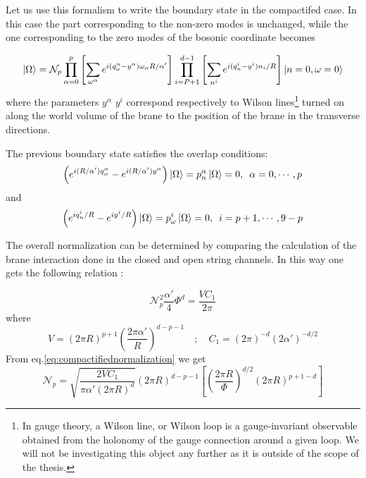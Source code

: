 Let us use this formalism to write the boundary state in the compactifed case. In this case the part corresponding to the non-zero modes is unchanged, while the one corresponding to the zero modes of the bosonic coordinate becomes \cite{Frau97}

\begin{equation}
\ket{\Omega} = \mathcal{N}_p\prod_{\alpha=0}^p{\left[\sum_{\omega^\alpha}e^{i(q_\omega^\alpha - y^\alpha)\omega_\alpha R/\alpha'}\right]}\prod_{i=P+1}^{d-1}{\left[\sum_{n^i}e^{i(q_n^i - y^i)n_i/R}\right]}\ket{n=0,\omega=0}
\end{equation}
where the parameters $y^\alpha$ $y^i$ correspond respectively to Wilson lines\footnote{In gauge theory, a Wilson line, or Wilson loop is a gauge-invariant observable obtained from the holonomy of the gauge connection around a given loop. We will not be investigating this object any further as it is outside of the scope of the thesis. } turned on along the world volume of the brane to the position of the brane in the transverse directions.
\par
The previous boundary state satisfies the overlap conditions:
\begin{equation}
\left(e^{i(R/\alpha')q_\omega^\alpha} - e^{i(R/\alpha')y^\alpha} \right)\ket{\Omega} = p_n^\alpha\ket{\Omega} = 0,\enskip \alpha = 0,\cdots,p
\end{equation}
and
\begin{equation}
\left(e^{iq_n^i/R} - e^{iy^i/R} \right)\ket{\Omega} = p_\omega^i\ket{\Omega} = 0,\enskip i = p+1,\cdots,9-p
\end{equation}

The overall normalization can be determined by comparing the calculation of the brane interaction done in the closed and open string channels. In this way one gets the following relation \cite{Frau97}:

\begin{equation}
\mathcal{N}_p^2\frac{\alpha'}{4}\Phi^d = \frac{VC_1}{2\pi}
\label{eq:compactifiednormalization}
\end{equation}
where 
\begin{equation}
V = (2\pi R)^{p+1}\left(\frac{2\pi\alpha'}{R}\right)^{d-p-1}\quad;\quad C_1 = (2\pi)^{-d}(2\alpha')^{-d/2}
\end{equation}
From eq.\eqref{eq:compactifiednormalization} we get
\begin{equation}
\mathcal{N}_p = \sqrt{\frac{2VC_1}{\pi\alpha'(2\pi R)^d}}(2\pi R)^{d-p-1}\left[\left(\frac{2\pi R}{\Phi}\right)^{d/2}(2\pi R)^{p+1-d}\right]
\end{equation}

